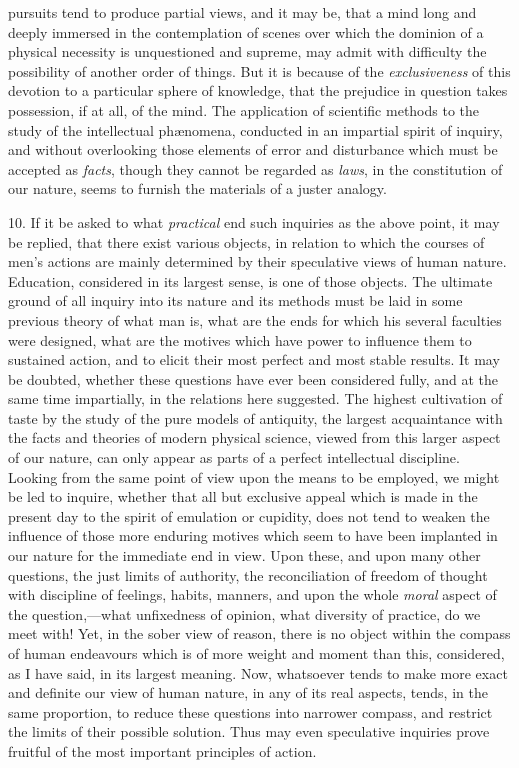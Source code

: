 \documentclass[oneside]{book}
\begin{document}
pursuits tend to produce partial views, and it may be, that a mind
long and deeply immersed in the contemplation of scenes over
which the dominion of a physical necessity is unquestioned and supreme, may admit with difficulty the possibility of another order of
things. But it is because of the \emph{exclusiveness} of this devotion to a
particular sphere of knowledge, that the prejudice in question
takes possession, if at all, of the mind. The application of
scientific methods to the study of the intellectual ph{\ae}nomena,
conducted in an impartial spirit of inquiry, and without overlooking those elements of error and disturbance which must be
accepted as \emph{facts}, though they cannot be regarded as \emph{laws}, in
the constitution of our nature, seems to furnish the materials of
a juster analogy.

10. If it be asked to what \emph{practical} end such inquiries as the
above point, it may be replied, that there exist various objects,
in relation to which the courses of men's actions are mainly determined by their speculative views of human nature. Education, considered in its largest sense, is one of those objects. The
ultimate ground of all inquiry into its nature and its methods
must be laid in some previous theory of what man is, what are
the ends for which his several faculties were designed, what
are the motives which have power to influence them to sustained
action, and to elicit their most perfect and most stable results.
It may be doubted, whether these questions have ever been
considered fully, and at the same time impartially, in the relations here suggested. The highest cultivation of taste by the
study of the pure models of antiquity, the largest acquaintance
with the facts and theories of modern physical science, viewed
from this larger aspect of our nature, can only appear as parts of
a perfect intellectual discipline. Looking from the same point
of view upon the means to be employed, we might be led to inquire, whether that all but exclusive appeal which is made in
the present day to the spirit of emulation or cupidity, does not
tend to weaken the influence of those more enduring motives
which seem to have been implanted in our nature for the immediate
end in view. Upon these, and upon many other questions,
the just limits of authority, the reconciliation of freedom of
thought with discipline of feelings, habits, manners, and upon
the whole \emph{moral} aspect of the question,---what unfixedness of
opinion, what diversity of practice, do we meet with! Yet, in
the sober view of reason, there is no object within the compass
of human endeavours which is of more weight and moment than
this, considered, as I have said, in its largest meaning. Now,
whatsoever tends to make more exact and definite our view of
human nature, in any of its real aspects, tends, in the same proportion,
to reduce these questions into narrower compass, and
restrict the limits of their possible solution. Thus may even
speculative inquiries prove fruitful of the most important principles
of action.
\end{document}
